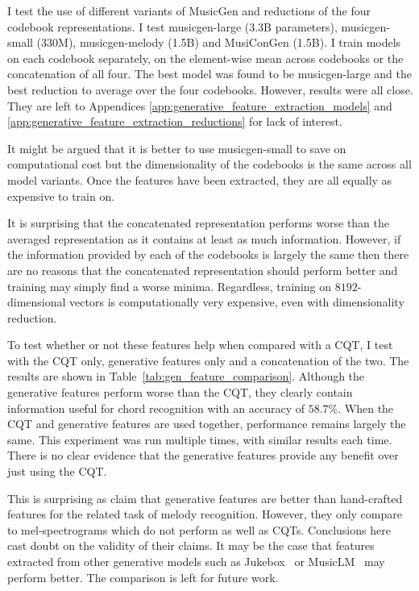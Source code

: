 I test the use of different variants of MusicGen and reductions of the four codebook representations. I test musicgen-large (3.3B parameters), musicgen-small (330M), musicgen-melody (1.5B) and MusiConGen (1.5B). I train models on each codebook separately, on the element-wise mean across codebooks or the concatenation of all four. The best model was found to be musicgen-large and the best reduction to average over the four codebooks. However, results were all close. They are left to Appendices \ref{app:generative_feature_extraction_models} and \ref{app:generative_feature_extraction_reductions} for lack of interest.

It might be argued that it is better to use musicgen-small to save on computational cost but the dimensionality of the codebooks is the same across all model variants. Once the features have been extracted, they are all equally as expensive to train on.

It is surprising that the concatenated representation performs worse than the averaged representation as it contains at least as much information. However, if the information provided by each of the codebooks is largely the same then there are no reasons that the concatenated representation should perform better and training may simply find a worse minima. Regardless, training on $8192$-dimensional vectors is computationally very expensive, even with dimensionality reduction.

To test whether or not these features help when compared with a CQT, I test with the CQT only, generative features only and a concatenation of the two. The results are shown in Table~\ref{tab:gen_feature_comparison}. Although the generative features perform worse than the CQT, they clearly contain information useful for chord recognition with an accuracy of $58.7\%$. When the CQT and generative features are used together, performance remains largely the same. This experiment was run multiple times, with similar results each time. There is no clear evidence that the generative features provide any benefit over just using the CQT. 

This is surprising as \citet{MelodyTranscriptionViaGenerativePreTraining} claim that generative features are better than hand-crafted features for the related task of melody recognition. However, they only compare to mel-spectrograms which do not perform as well as CQTs. Conclusions here cast doubt on the validity of their claims. It may be the case that features extracted from other generative models such as Jukebox~\citep{Jukebox} or MusicLM~\citep{MusicLM} may perform better. The comparison is left for future work.

